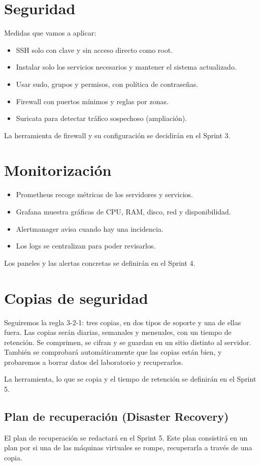 \documentclass[12pt,a4paper]{article}
\begin{document}
\section{Seguridad}
Medidas que vamos a aplicar:
\begin{itemize}
\item SSH solo con clave y sin acceso directo como root.
\item Instalar solo los servicios necesarios y mantener el sistema actualizado.
\item Usar sudo, grupos y permisos, con política de contraseñas.
\item Firewall con puertos mínimos y reglas por zonas.
\item Suricata para detectar tráfico sospechoso (ampliación).
\end{itemize}
La herramienta de firewall y su configuración se decidirán en el Sprint 3.

\section{Monitorización}
\begin{itemize}
\item Prometheus recoge métricas de los servidores y servicios.
\item Grafana muestra gráficas de CPU, RAM, disco, red y disponibilidad.
\item Alertmanager avisa cuando hay una incidencia.
\item Los logs se centralizan para poder revisarlos.
\end{itemize}
Los paneles y las alertas concretas se definirán en el Sprint 4.

\section{Copias de seguridad}
Seguiremos la regla 3-2-1: tres copias, en dos tipos de soporte y una de ellas fuera. Las copias serán diarias, semanales y mensuales, con un tiempo de retención. Se comprimen, se cifran y se guardan en un sitio distinto al servidor. También se comprobará automáticamente que las copias están bien, y probaremos a borrar datos del laboratorio y recuperarlos.

La herramienta, lo que se copia y el tiempo de retención se definirán en el Sprint 5.

\subsection{Plan de recuperación (Disaster Recovery)}
El plan de recuperación se redactará en el Sprint 5. Este plan consistirá en un plan por si una de las máquinas virtuales se rompe, recuperarla a través de una copia.
\end{document}
